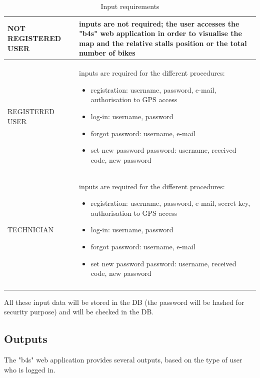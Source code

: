 \documentclass{article}
\begin{document}
\begin{longtable}{|l|p{}|}
            \hline
            NOT REGISTERED USER &  inputs are not required; the user accesses the "b4s" web application in order to visualise the map and the relative stalls position or the total number of bikes \\ 
            \hline
            REGISTERED USER  & inputs are required for the different procedures: \begin{itemize}
                \item registration: username, password, e-mail, authorisation to GPS access 
                \item log-in: username, password
                \item forgot password: username, e-mail
                \item set new password password: username, received code, new password
            \end{itemize}
            \\
            \hline
            TECHNICIAN &  inputs are required for the different procedures: \begin{itemize}
                \item registration: username, password, e-mail, secret key, authorisation to GPS access
                \item log-in: username, password
                \item forgot password: username, e-mail
                \item set new password password: username, received code, new password
            \end{itemize}
            \\
            \hline
\caption{Input requirements} \\
\end{longtable}
        
 All these input data will be stored in the DB (the password will be hashed for security purpose) and will be checked in the DB.
 
\subsection{Outputs}
The "b4s" web application provides several outputs, based on the type of user who is logged in.
\end{document}
